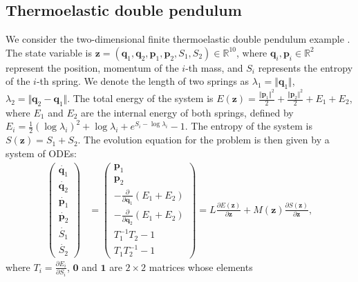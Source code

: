 \documentclass[openacc]{rsproca_new}%
\newcommand{\z}{\bm{z}}
\begin{document}
\subsection{Thermoelastic double pendulum}
We consider the two-dimensional finite thermoelastic double pendulum example \cite{romero2009thermodynamically}. The state variable is 
$\z = (\bm{q}_1, \bm{q}_2, \bm{p}_1, \bm{p}_2, S_1, S_2) \in \mathbb{R}^{10}$, 
where $\bm{q}_i, \bm{p}_i \in \mathbb{R}^2$ represent the position, momentum of the $i$-th mass, and
$S_i$ represents the entropy of the $i$-th spring. We denote the length of two springs as 
$\lambda_1 = \Vert\bm{q}_1\Vert$, $\lambda_2 = \Vert\bm{q}_2 - \bm{q}_1\Vert$. 
The total energy of the system is $E(\z) = \frac{\Vert\bm{p}_1\Vert^2}{2} + \frac{\Vert\bm{p}_2\Vert^2}{2} + E_1 + E_2$, where $E_1$ and $E_2$ are the internal energy of both springs, defined by
$E_i = \frac{1}{2} (\log\lambda_i)^2 + \log\lambda_i + e^{S_i-\log\lambda_i}-1$.
The entropy of the system is $S(\z) = S_1 + S_2$. 
The evolution equation for the problem is 
then given by a system of ODEs:
\begin{equation} \label{eqn-dp}
\begin{split}
    \begin{pmatrix} \dot{\bm{q}_1} \\\dot{\bm{q}_2} \\ \dot{\bm{p}_1} \\ \dot{\bm{p}_2} \\ \dot{S_1} \\ \dot{S_2} \end{pmatrix}
    &=\begin{pmatrix} \bm{p}_1 \\ \bm{p}_2 \\
    -\frac{\partial}{\partial \bm{q}_1}(E_1 + E_2) \\
    -\frac{\partial}{\partial \bm{q}_2}(E_1 + E_2) \\
    T_1^{-1}T_2 - 1 \\ T_1T_2^{-1} - 1
    \end{pmatrix}=L\frac{\partial E(\z)}{\partial \z} + M(\z)\frac{\partial S(\z)}{\partial \z},
\end{split}
\end{equation}
where
$T_i = \frac{\partial E_i}{\partial S_i}$, 
$\bm{0}$ and $\bm{1}$
are $2\times 2$ matrices whose elements
\end{document}
